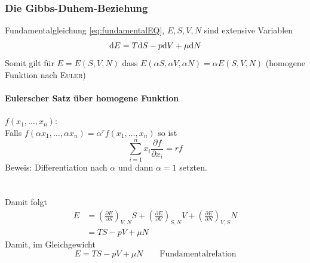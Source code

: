 \subsubsection{Die Gibbs-Duhem-Beziehung}
Fundamentalgleichung \eqref{eq:fundamentalEQ}, $E, S, V, N$ sind extensive Variablen
\begin{equation}
    \mathrm{d} E = T \mathrm{d} S - p \mathrm{d} V + \mu \mathrm{d} N
\end{equation}
Somit gilt für $E=E(S, V, N)$ dass $E(\alpha S, \alpha V, \alpha N) = \alpha E(S, V, N)$ (homogene Funktion nach \textsc{Euler})
\paragraph{Eulerscher Satz über homogene Funktion} $f(x_1, \ldots, x_n)$: \\
Falls $f(\alpha x_1, \ldots, \alpha x_n) = \alpha^r f(x_1, \ldots, x_n)$ so ist
\begin{equation}
    \sum_{i=1}^{n} x_i \frac{\partial f}{\partial x_i} = r f
\end{equation}
Beweis: Differentiation nach $\alpha$ und dann $\alpha = 1$ setzten.
\paragraph{}\mbox{}\\
Damit folgt
\begin{equation}
    \begin{split}
        E &= \left( \frac{\partial E}{\partial S} \right)_{V, N} S + \left( \frac{\partial E}{\partial V} \right)_{S, N} V + \left( \frac{\partial E}{\partial N} \right)_{V, S} N \\
        &= T S - p V + \mu N
    \end{split}
\end{equation}
Damit, im Gleichgewicht
\begin{equation}
    E = T S - p V + \mu N \qquad \text{Fundamentalrelation}
\end{equation}